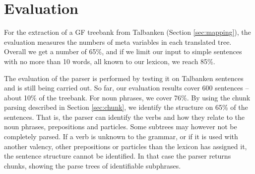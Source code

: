 \documentclass[runningheads,a4paper]{llncs}
\begin{document}

\section{Evaluation}

For the extraction of a GF treebank from Talbanken (Section \ref{sec:mapping}),
the evaluation measures the numbers of meta variables in each translated tree.
Overall we get a number of 65\%, and if we limit our input to
simple sentences with no more than 10 words, all known to
our lexicon, we reach 85\%. 


The evaluation of the parser is performed by testing it on Talbanken sentences
and is still being carried out. So far, our evaluation results cover
600 sentences -- about 10\% of the treebank. 
For noun phrases, we cover 76\%.  By using the chunk parsing described in Section
\ref{sec:chunk}, we identify the structure on 65\% of the sentences. That
is, the parser can identify the verbs and how they relate to the noun phrases,
prepositions and particles. Some subtrees may  however not be
completely parsed. If a verb is unknown to the grammar, or if it is used with
another valency, other prepositions or particles than the lexicon has assigned
it, the sentence structure cannot be identified. In that case
the parser returns chunks, showing the parse trees of identifiable subphrases.
\end{document}

